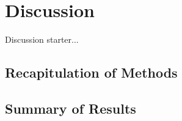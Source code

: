 \chapter{Discussion} \label{chap:discussion}
Discussion starter...

\section{Recapitulation of Methods} \label{sec:recapitulation_of_methods}

\section{Summary of Results} \label{sec:summary_of_results}
